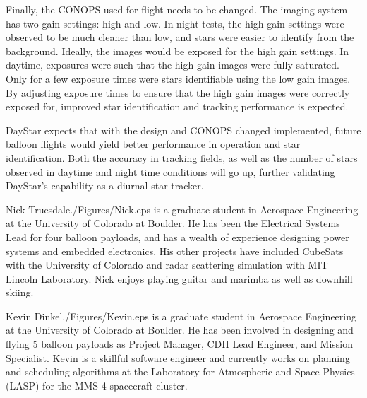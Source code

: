 \documentclass[twocolumn,letterpaper]{IEEEAerospace2012}
\newcommand{\rootdir}{./Figures/}
\begin{document}
Finally, the CONOPS used for flight needs to be changed. The imaging system has two gain settings: high and low. In night tests, the high gain settings were observed to be much cleaner than low, and stars were easier to identify from the background. Ideally, the images would be exposed for the high gain settings. In daytime, exposures were such that the high gain images were fully saturated. Only for a few exposure times were stars identifiable using the low gain images. By adjusting exposure times to ensure that the high gain images were correctly exposed for, improved star identification and tracking performance is expected.

DayStar expects that with the design and CONOPS changed implemented, future balloon flights would yield better performance in operation and star identification. Both the accuracy in tracking fields, as well as the number of stars observed in daytime and night time conditions will go up, further validating DayStar's capability as a diurnal star tracker.




\thebiography
\begin{biographywithpic}{Nick Truesdale}{\rootdir Nick.eps}
is a graduate student in Aerospace Engineering at the University of Colorado at Boulder.
He has been the Electrical Systems Lead for four balloon payloads, and has a wealth of experience designing power systems and embedded electronics. His other projects have included CubeSats with the University of Colorado and radar scattering simulation with MIT Lincoln Laboratory. Nick enjoys playing guitar and marimba as well as downhill skiing.
\end{biographywithpic}

\begin{biographywithpic} {Kevin Dinkel}{\rootdir Kevin.eps}
is a graduate student in Aerospace Engineering at the University of Colorado at Boulder. He has been involved in designing and flying 5 balloon payloads as Project Manager, CDH Lead Engineer, and Mission Specialist. Kevin is a skillful software engineer and currently works on planning and scheduling algorithms at the Laboratory for Atmospheric and Space Physics (LASP) for the MMS 4-spacecraft cluster.
\end{biographywithpic}
\end{document}
